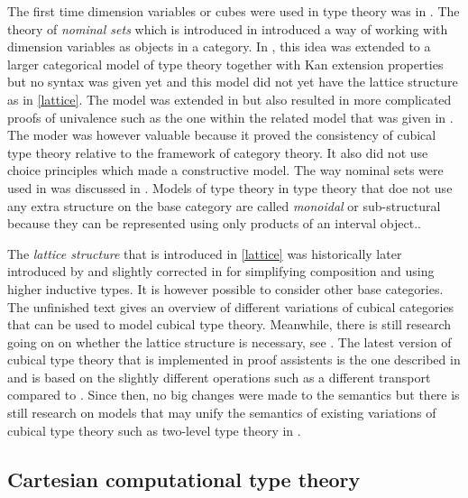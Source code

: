 \documentclass[12pt,a4paper,twoside,xetex]{book}
\newcommand{\keyword}[1]{\emph{#1}\index{#1}}
\begin{document}
The first time dimension variables or cubes were used in type theory was in \cite{bernardy2012computational}. The theory of \keyword{nominal sets} which is introduced in \cite{Pitts:2013:NSN:2512979} introduced a way of working with dimension variables as objects in a category. In \cite{Bezem2014}, this idea was extended to a larger categorical model of type theory together with Kan extension properties but no syntax was given yet and this  model did not yet have the lattice structure as in 
\cref{lattice}. The model was extended in \cite{huber2015model} but also resulted in more complicated proofs of univalence such as the one within the related model that was given in \cite{Bezem2018}. The moder was however valuable because it proved the consistency of cubical type theory relative to the framework of category theory. It also did not use choice principles which made a constructive model. The way nominal sets were used in \cite{Bezem2014} was discussed in \cite{Pit14}. Models of type theory in type theory that doe not use any extra structure on the base category are called \keyword{monoidal} or sub-structural because they can be represented using only products of an interval object.. 


The \keyword{lattice structure} that is introduced in \cref{lattice} was historically 
later introduced by \cite{Cohen2016} and slightly corrected in \cite{Huber2016} for simplifying composition and using 
higher inductive types. It is however possible to consider other base categories. The unfinished text \cite{Awodey2016June} gives an 
overview of different variations of cubical categories that can be used to model 
cubical type theory. Meanwhile, there is still research going on on whether the lattice structure is necessary, see \cite{Altenkirch2017}. The latest version of cubical type theory that is implemented in proof assistents is the one described in \cite{Coquand2018} and is based on the slightly different operations such as a different transport compared to \cite{Huber2016}. Since then, no big changes were made to the semantics but there is still research on models that may unify the semantics of existing variations of cubical type theory such as two-level type theory in \cite{Uem19}. 


\subsection{Cartesian computational type theory}\label{comptt}
\end{document}
